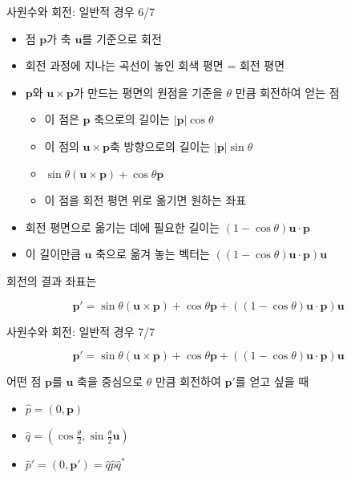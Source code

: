 \begin{frame}[fragile]{사원수와 회전: 일반적 경우 6/7}

\begin{itemize}
\item 점 $\mathbf p$가 축 $\mathbf u$를 기준으로 회전
\item 회전 과정에 지나는 곡선이 놓인 회색 평면 = 회전 평면
\item $\mathbf p$와 $\mathbf u \times \mathbf p$가 만드는 평면의 원점을 기준을 $\theta$ 만큼 회전하여 얻는 점
	\begin{itemize}
	\item 이 점은 $\mathbf p$ 축으로의 길이는 $|\mathbf p| \cos \theta$
	\item 이 점의 $\mathbf u \times \mathbf p$축 방향으로의 길이는 $|\mathbf p| \sin \theta $
	\item $\sin \theta (\mathbf u \times \mathbf p) + \cos \theta \mathbf p$
	\item 이 점을 회전 평면 위로 옮기면 원하는 좌표
	\end{itemize}
\item 회전 평면으로 옮기는 데에 필요한 길이는 $(1 - \cos \theta) \mathbf u \cdot \mathbf p$
\item 이 길이만큼 $\mathbf u$ 축으로 옮겨 놓는 벡터는 $((1-\cos \theta ) \mathbf u \cdot \mathbf p ) \mathbf u$
\end{itemize}

회전의 결과 좌표는 

$$\mathbf p' = \sin \theta (\mathbf u \times \mathbf p) + \cos \theta \mathbf p +((1-\cos \theta ) \mathbf u \cdot \mathbf p ) \mathbf u$$

\end{frame}

\begin{frame}[fragile]{사원수와 회전: 일반적 경우 7/7}


$$\mathbf p' = \sin \theta (\mathbf u \times \mathbf p) + \cos \theta \mathbf p +((1-\cos \theta ) \mathbf u \cdot \mathbf p ) \mathbf u$$

\begin{block}{어떤 점 $\mathbf p$를 $\mathbf u$ 축을 중심으로 $\theta$ 만큼 회전하여 $\mathbf p'$를 얻고 싶을 때}
	\begin{itemize}
	\item $\hat p = (0, \mathbf p)$
	\item $\hat q = (\cos \frac{\theta}{2}, \sin \frac{\theta}{2} \mathbf u)$
	\item $\hat p' = (0, \mathbf p') = \hat q \hat p \hat q^* $
	\end{itemize}
\end{block}

\end{frame}

